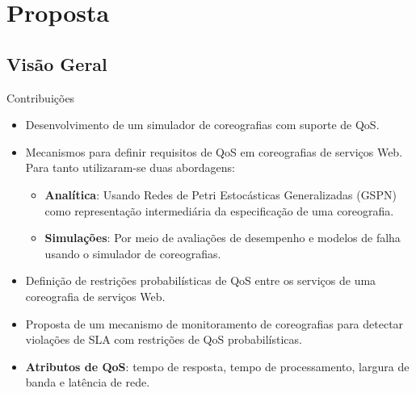 \documentclass[xcolor=svgnames]{beamer}
\begin{document}




\section{Proposta}

\subsection{Visão Geral}
   \begin{frame}{Contribuições}

      \begin{itemize}
	  \item <1->  Desenvolvimento de um simulador de coreografias com suporte de QoS.
          \item <2-> Mecanismos para definir requisitos de QoS em coreografias de serviços Web. Para tanto utilizaram-se duas abordagens:
             \begin{itemize}
                  \item \textbf{Analítica}:  Usando Redes de Petri Estocásticas Generalizadas (GSPN) como representação intermediária
		    da especificação de uma coreografia.
                  \item \textbf{Simulações}: Por meio de avaliações de desempenho e modelos de falha usando o simulador de coreografias.
            \end{itemize}

         \item <3-> Definição de restrições  probabilísticas de QoS entre os serviços de uma  coreografia de serviços Web.
	 \item <4-> Proposta de um mecanismo de monitoramento de coreografias para detectar violações de SLA com restrições de QoS probabilísticas.
	 \item <5->\textbf{Atributos de QoS}: tempo de resposta, tempo de processamento, largura de banda e latência de rede.
       \end{itemize}


   \end{frame}
\end{document}
